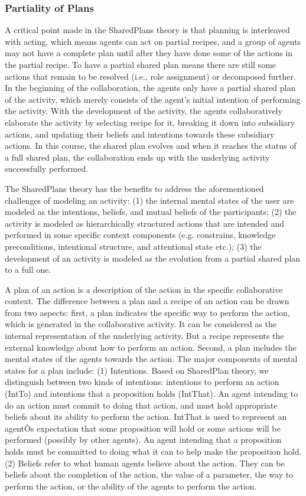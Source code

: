 \subsubsection*{Partiality of Plans}
A critical point made in the SharedPlans theory is that planning is interleaved with acting, which means agents can act on partial recipes, and a group of agents may not have a complete plan until after they have done some of the actions in the partial recipe. To have a partial shared plan means there are still some actions that remain to be resolved (i.e., role assignment) or decomposed further. In the beginning of the collaboration, the agents only have a partial shared plan of the activity, which merely consists of the agent’s initial intention of performing the activity. With the development of the activity, the agents collaboratively elaborate the activity by selecting recipe for it, breaking it down into subsidiary actions, and updating their beliefs and intentions towards these subsidiary actions. In this course, the shared plan evolves and when it reaches the status of a full shared plan, the collaboration ends up with the underlying activity successfully performed.

The SharedPlans theory has the benefits to address the aforementioned challenges of modeling an activity:  (1) the internal mental states of the user are modeled as the intentions, beliefs, and mutual beliefs of the participants; (2) the activity is modeled as hierarchically structured actions that are intended and performed in some specific context components (e.g. constrains, knowledge preconditions, intentional structure, and attentional state etc.); (3) the development of an activity is modeled as the evolution from a partial shared plan to a full one. 

A plan of an action is a description of the action in the specific collaborative context. The difference between a plan and a recipe of an action can be drawn from two aspects: first, a plan indicates the specific way to perform the action, which is generated in the collaborative activity. It can be considered as the internal representation of the underlying activity. But a recipe represents the external knowledge about how to perform an action. Second, a plan includes the mental states of the agents towards the action. The major components of mental states for a plan include: (1) Intentions. Based on SharedPlan theory, we distinguish between two kinds of intentions: intentions to perform an action (IntTo) and intentions that a proposition holds (IntThat). An agent intending to do an action must commit to doing that action, and must hold appropriate beliefs about its ability to perform the action. IntThat is used to represent an agentÕs expectation that some proposition will hold or some actions will be performed (possibly by other agents). An agent intending that a proposition holds must be committed to doing what it can to help make the proposition hold. (2) Beliefs refer to what human agents believe about the action. They can be beliefs about the completion of the action, the value of a parameter, the way to perform the action, or the ability of the agents to perform the action.

